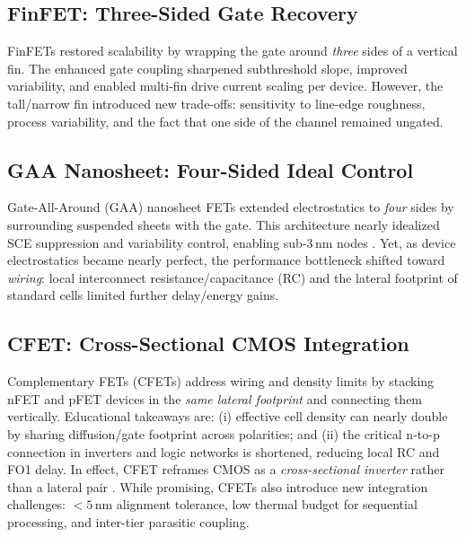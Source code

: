 \documentclass[conference]{IEEEtran}
\begin{document}
\subsection{FinFET: Three-Sided Gate Recovery}
FinFETs restored scalability by wrapping the gate around
\emph{three} sides of a vertical fin. The enhanced gate coupling
sharpened subthreshold slope, improved variability, and enabled
multi-fin drive current scaling per device. However, the tall/narrow
fin introduced new trade-offs: sensitivity to line-edge roughness,
process variability, and the fact that one side of the channel
remained ungated.

\subsection{GAA Nanosheet: Four-Sided Ideal Control}
Gate-All-Around (GAA) nanosheet FETs extended electrostatics to
\emph{four} sides by surrounding suspended sheets with the gate. This
architecture nearly idealized SCE suppression and variability control,
enabling sub-3\,nm nodes \cite{bsimcmg_sispad2017}. Yet, as device
electrostatics became nearly perfect, the performance bottleneck
shifted toward \emph{wiring}: local interconnect resistance/capacitance
(RC) and the lateral footprint of standard cells limited further
delay/energy gains.

\subsection{CFET: Cross-Sectional CMOS Integration}
Complementary FETs (CFETs) address wiring and density limits by stacking
nFET and pFET devices in the \emph{same lateral footprint} and
connecting them vertically. Educational takeaways are:
(i) effective cell density can nearly double by sharing
diffusion/gate footprint across polarities; and
(ii) the critical n-to-p connection in inverters and logic networks is
shortened, reducing local RC and FO1 delay. In effect, CFET reframes
CMOS as a \emph{cross-sectional inverter} rather than a lateral pair
\cite{imec_cfet_iedm2020}. While promising, CFETs also introduce
new integration challenges: $<5$\,nm alignment tolerance, low thermal
budget for sequential processing, and inter-tier parasitic coupling.
\end{document}
